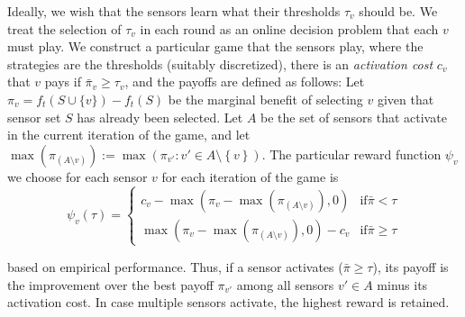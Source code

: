 \documentclass{sig-alternate-dan}
\numberwithin{equation}{section}
\newcommand{\gpay}{\ensuremath{\psi}}
\newcommand{\paymaxact}[1]{\ensuremath{\max\paren{\payoff_{(A
        \setminus {#1})}}}}
\newcommand{\estimate}[1]{\bar{#1}}
\newcommand{\thresh}{\ensuremath{\tau}}
\newcommand{\actcost}{\ensuremath{c}}
\newcommand{\sensor}{\ensuremath{v}}
\newcommand{\obj}{\ensuremath{f}} %
\newcommand{\payoff}{\ensuremath{\pi}}
\newcommand{\ignore}[1]{}
\newcommand{\paren} [1] {\ensuremath{ \left( {#1} \right) }}
\newcommand{\set}[1]{\ensuremath{\left\{#1\right\}}}
\begin{document}
Ideally, we wish that the sensors learn what their thresholds
$\thresh_{\sensor}$ should be.  
\ignore{
Consider that in many physical sensing
applications the marginal value derived from a sensor's
reading depends strongly on what other nearby sensors observe and
whether they report their readings to the central server.
If a set of sensors $S$ typically have redundant readings, we would
like a few sensors in $S$ to have low thresholds, and most other
sensors in $S$ to have high thresholds, so that in expectation few
sensors in $S$ report their (redundant) readings in any given round.
In contrast, setting a fixed threshold $\thresh$ for all sensors in
$S$ means that whenever one sensor in $S$ detects a sufficiently
interesting event, all sensors in $S$ report to the server, thus leading to a large number of unnecessary messages.
} %
We treat the selection of $\thresh_{\sensor}$ in each round as an
online decision problem that each $\sensor$ must play.
We construct a particular game that the sensors play, where the
strategies are the thresholds (suitably discretized), there is an  
\emph{activation cost} $\actcost_{\sensor}$ that $\sensor$ pays if 
$\estimate{\payoff}_{\sensor} \ge \thresh_{\sensor}$, and the 
%
payoffs are defined as follows:
%
Let $\payoff_{\sensor} = \obj_{t}(S\cup \{v\})-\obj_{t}(S)$ be the
marginal benefit of selecting $\sensor$ given that sensor set $S$ has
already been selected.
Let $A$ be the set of sensors that activate in the current iteration of
the game, and let $\paymaxact{\sensor} := \max \paren{\payoff_{\sensor'}
    : \sensor' \in A \setminus \set{\sensor}}$.
The particular reward function $\gpay_{\sensor}$ we 
choose for each sensor $\sensor$  for each iteration of the game is 
\[
\gpay_{\sensor}(\thresh) = \left\{
\begin{array}{ll}
\actcost_{\sensor} - \max\paren{\payoff_{\sensor} - \paymaxact{\sensor}, 0} & \text{if
}\estimate{\payoff} < \thresh\\
\max\paren{\payoff_{\sensor} - \paymaxact{\sensor}, 0} - \actcost_{\sensor} & \text{if
}\estimate{\payoff} \ge \thresh
\end{array}
\right.
\]
%
\ignore{
\[
\gpay_{\sensor}(\thresh) = \left\{
\begin{array}{ll}
\actcost_{\sensor} - \paren{\payoff_{\sensor} - \paymaxact{\sensor}} & \text{if
}\estimate{\payoff} < \thresh\\
\paren{\payoff_{\sensor} - \paymaxact{\sensor}} - \actcost_{\sensor} & \text{if
}\estimate{\payoff} \ge \thresh
\end{array}
\right.
\]
}
based on empirical performance. Thus, if a sensor activates ($\estimate{\payoff} \ge \thresh$), its payoff is the improvement over the best payoff $\payoff_{\sensor'}$ among all sensors $\sensor'\in A$ minus its activation cost. In case multiple sensors activate, the highest reward is retained.
\end{document}
